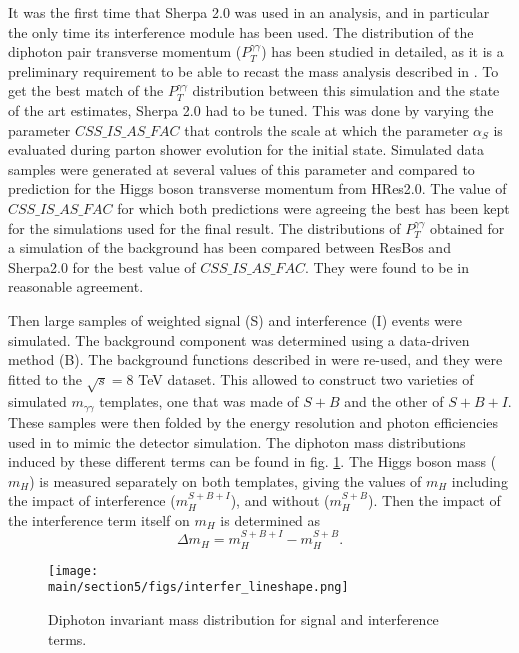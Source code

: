 It was the first time that Sherpa 2.0 was used in an analysis, and in particular the only time its interference module has been used. The distribution of the diphoton pair transverse momentum ($P_T^{\gamma\gamma}$) has been studied in detailed, as it is a preliminary requirement to be able to recast the mass analysis described in \cite{Aad:2014aba}. To get the best match of the $P_T^{\gamma\gamma}$ distribution between this simulation and the state of the art estimates, Sherpa 2.0 had to be tuned. This was done by varying the parameter $CSS\_IS\_AS\_FAC$ that controls the scale at which the parameter $\alpha_S$ is evaluated during parton shower evolution for the initial state. Simulated data samples were generated at several values of this parameter and compared to prediction for the Higgs boson transverse momentum from HRes2.0. The value of $CSS\_IS\_AS\_FAC$ for which both predictions were agreeing the best has been kept for the simulations used for the final result. The distributions of $P_T^{\gamma\gamma}$ obtained for a simulation of the background has been compared between ResBos and Sherpa2.0 for the best value of $CSS\_IS\_AS\_FAC$. They were found to be in reasonable agreement.

Then large samples of weighted signal (S) and interference (I) events were simulated. The background component was determined using a data-driven method (B). The background functions described in \cite{Aad:2014aba} were re-used, and they were fitted to the $\sqrt{s} = 8$ TeV dataset. This allowed to construct two varieties of simulated $m_{\gamma\gamma}$ templates, one that was made of $S+B$ and the other of $S+B+I$. These samples were then folded by the energy resolution and photon efficiencies used in \cite{Aad:2014aba} to mimic the detector simulation. The diphoton mass distributions induced by these different terms can be found in fig. \ref{fig:interfer_lineshape}. The Higgs boson mass ($m_H$) is measured separately on both templates, giving the values of $m_H$ including the impact of interference ($m_H^{S+B+I}$), and without ($m_H^{S+B}$). Then the impact of the interference term itself on $m_H$ is determined as \begin{equation}
    \Delta m_H = m_H^{S+B+I}-m_H^{S+B}.
\end{equation}

\begin{figure}
    \centering
    \texttt{[image: \\main/section5/figs/interfer\_lineshape.png]}
    \caption{Diphoton invariant mass distribution for signal and interference terms.}
    \label{fig:interfer_lineshape}
\end{figure}

